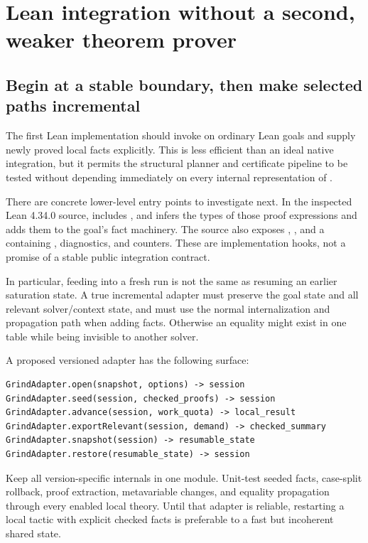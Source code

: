 \section{Lean integration without a second, weaker theorem prover}

\subsection{Begin at a stable boundary, then make selected paths incremental}

The first Lean implementation should invoke \Grind{} on ordinary Lean goals
and supply newly proved local facts explicitly. This is less efficient than
an ideal native integration, but it permits the structural planner and
certificate pipeline to be tested without depending immediately on every
internal representation of \Grind{}.

There are concrete lower-level entry points to investigate next. In the
inspected Lean 4.34.0 source,  includes
, and  infers the types of those proof
expressions and adds them to the goal's fact machinery. The source also
exposes , , and a  containing
, diagnostics, and counters.\cite{grindsource}
These are implementation hooks, not a promise of a stable public integration
contract.

In particular, feeding  into a fresh run is not the
same as resuming an earlier saturation state. A true incremental adapter must
preserve the goal state and all relevant solver/context state, and must use
the normal internalization and propagation path when adding facts. Otherwise
an equality might exist in one table while being invisible to another solver.

A proposed versioned adapter has the following surface:
\begin{lstlisting}
GrindAdapter.open(snapshot, options) -> session
GrindAdapter.seed(session, checked_proofs) -> session
GrindAdapter.advance(session, work_quota) -> local_result
GrindAdapter.exportRelevant(session, demand) -> checked_summary
GrindAdapter.snapshot(session) -> resumable_state
GrindAdapter.restore(resumable_state) -> session
\end{lstlisting}

Keep all version-specific internals in one module. Unit-test seeded facts,
case-split rollback, proof extraction, metavariable changes, and equality
propagation through every enabled local theory. Until that adapter is reliable,
restarting a local tactic with explicit checked facts is preferable to a
fast but incoherent shared state.

